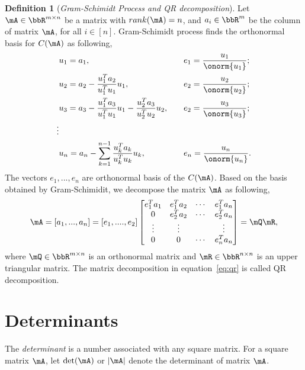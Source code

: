 \documentclass[11pt]{article}
\theoremstyle{plain}
\theoremstyle{definition}
\newtheorem{defn}{Definition}
\begin{document}
\begin{defn}[\textit{Gram-Schimidt Process and QR decomposition}]\label{gram-schimidt}
Let $\mA \in \bbR^{m \times n}$ be a matrix with $rank(\mA) = n$, and  $a_i \in \bbR^{m}$ be the column of matrix $\mA$, for all $i \in [n]$. Gram-Schimidt process finds the orthonormal basis for $C(\mA)$ as following,
\begin{align}
	&u_1 = a_1, &&\quad e_1 = \frac{u_1}{\onorm{u_1}};\\
	&u_2 = a_2 - \frac{u_1^T a_2}{u_1^T u_1} u_1 ,&&\quad  e_2 = \frac{u_2}{\onorm{u_2}};\\
	&u_3 = a_3 - \frac{u_1^T a_3}{u_1^T u_1} u_1 - \frac{u_2^T a_3}{u_2^T u_2} u_2,&&\quad  e_2 = \frac{u_3}{\onorm{u_3}};\\
	\vdots\\
	&u_n = a_n - \sum_{k = 1}^{n-1} \frac{u_k^T a_k}{u_k^T u_k} u_k, && \quad e_n = \frac{u_n}{\onorm{u_n}}.
\end{align}
 The vectors $e_1,...,e_n$ are orthonormal basis of the $C(\mA)$. Based on the basis obtained by Gram-Schimidit, we decompose the matrix $\mA$ as following,
 \begin{equation}\label{eq:qr}
 	\mA = [a_1,...,a_n] = [e_1,....,e_2] \begin{bmatrix}
 		e_1^T a_1 & e_1^T a_2 & \cdots & e_1^T a_n\\
 		0&e_2^T a_2 & \cdots & e_2^T a_n\\
 		\vdots &\vdots & & \vdots \\
 		0 &0&\cdots & e_n^T a_n
 	\end{bmatrix} = \mQ \mR,
 \end{equation}
	where $\mQ \in \bbR^{m \times n}$ is an orthonormal matrix and $\mR \in \bbR^{n \times n}$ is an upper triangular matrix. The matrix decomposition in equation~\eqref{eq:qr} is called QR decomposition.
\end{defn}

\section{Determinants}
The \textit{determinant} is a number associated with any square matrix. For a square matrix $\mA$, let $\det(\mA)$ or $|\mA|$ denote the determinant of matrix $\mA$.
\end{document}
